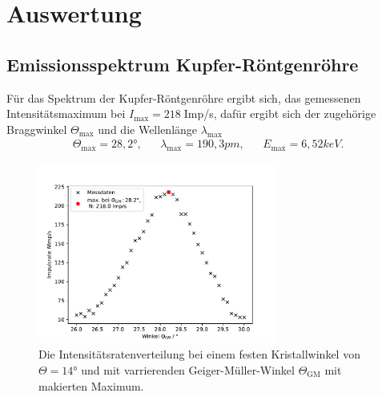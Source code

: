 \newpage
\section{Auswertung}
\subsection{Emissionsspektrum Kupfer-Röntgenröhre}
Für das Spektrum der Kupfer-Röntgenröhre ergibt sich, das gemessenen
Intensitätsmaximum bei $I_{\text{max}}=218\;$Imp/s, dafür ergibt sich
der zugehörige Braggwinkel $\Theta_{\text{max}}$ und die Wellenlänge $\lambda_{\text{max}}$
\begin{align*}
    \Theta_{\text{max}}=28,2°, && \lambda_{\text{max}}=190,3\si{pm},&&E_{\text{max}}=6,52\si{keV}.
\end{align*}
\begin{figure}[H]
    \centering
    \includegraphics[width=0.7\textwidth]{plots/messdaten1.pdf}
    \caption{Die Intensitätsratenverteilung bei einem festen Kristallwinkel
    von $\Theta=14$° und mit varrierenden Geiger-Müller-Winkel $\Theta_{\text{GM}}$ mit makierten Maximum.}
    \label{fig:spektrums}
\end{figure}
\newpage
